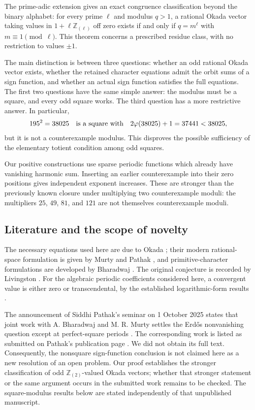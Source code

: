\documentclass[11pt]{amsart}
\theoremstyle{definition}
\theoremstyle{remark}
\newcommand{\Z}{\mathbb Z}
\newcommand{\Zt}{\mathbb Z_{(2)}}
\numberwithin{equation}{section}
\begin{document}
The prime-adic extension gives an exact congruence classification beyond
the binary alphabet: for every prime $\ell$ and modulus $q>1$, a rational
Okada vector taking values in $1+\ell\Z_{(\ell)}$ off zero exists if
and only if $q=m^\ell$ with $m\equiv1\pmod\ell$. This theorem concerns
a prescribed residue class, with no restriction to values $\pm1$.

The main distinction is between three questions: whether an odd rational
Okada vector exists, whether the retained character equations admit the
orbit sums of a sign function, and whether an actual sign function satisfies
the full equations. The first two questions have the same simple answer:
the modulus must be a square, and every odd square works. The third question
has a more restrictive answer. In particular,
\[
 195^2=38025\quad\hbox{is a square with}\quad
 2\varphi(38025)+1=37441<38025,
\]
but it is not a counterexample modulus. This disproves the possible
sufficiency of the elementary totient condition among odd squares.

Our positive constructions use sparse periodic functions which already
have vanishing harmonic sum. Inserting an earlier counterexample into their
zero positions gives independent exponent increases. These are stronger
than the previously known closure under multiplying two counterexample
moduli: the multipliers $25$, $49$, $81$, and $121$ are not themselves
counterexample moduli.

\subsection{Literature and the scope of novelty}
The necessary equations used here are due to Okada \cite{Okada}; their
modern rational-space formulation is given by Murty and Pathak \cite{MP},
and primitive-character formulations are developed by Bharadwaj \cite{Bha}.
The original conjecture is recorded by Livingston \cite{Liv}. For the
algebraic periodic coefficients considered here, a convergent value is
either zero or transcendental, by the established logarithmic-form results
\cite{BBW,MS}.

The announcement of Siddhi Pathak's seminar on 1 October 2025 states that
joint work with A. Bharadwaj and M. R. Murty settles the Erd\H{o}s
nonvanishing question except at perfect-square periods \cite{Seminar}.
The corresponding work is listed as submitted on Pathak's publication
page \cite{Submitted}. We did not obtain its full text. Consequently,
the nonsquare sign-function conclusion is not claimed here as a new
resolution of an open problem. Our proof establishes the stronger
classification of odd $\Zt$-valued Okada vectors; whether that stronger
statement or the same argument occurs in the submitted work remains to
be checked. The square-modulus results below are stated independently
of that unpublished manuscript.
\end{document}

